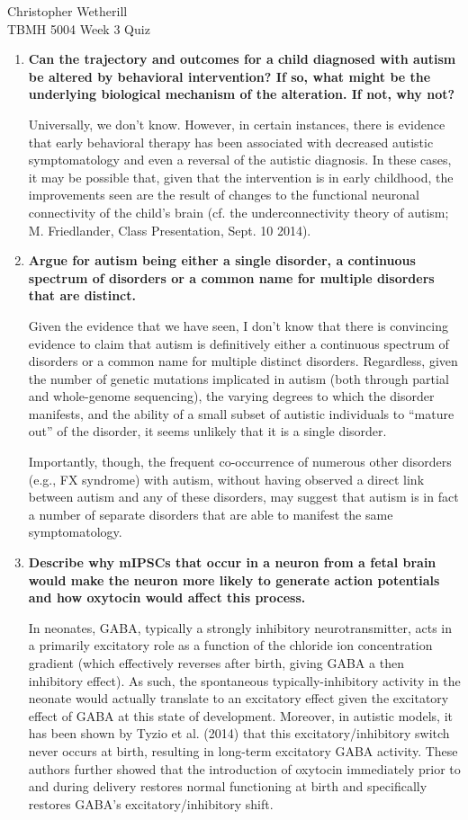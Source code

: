 \documentclass[11pt,final] {article}
\begin{document}
\noindent Christopher Wetherill\\
TBMH 5004 Week 3 Quiz

\begin{enumerate}
	\item {\bfseries Can the trajectory and outcomes for a child diagnosed with autism be altered by behavioral intervention? If so, what might be the underlying biological mechanism of the alteration. If not, why not?}
	
	Universally, we don't know. However, in certain instances, there is evidence that early behavioral therapy has been associated with decreased autistic symptomatology and even a reversal of the autistic diagnosis. In these cases, it may be possible that, given that the intervention is in early childhood, the improvements seen are the result of changes to the functional neuronal connectivity of the child's brain (cf. the underconnectivity theory of autism; M. Friedlander, Class Presentation, Sept. 10 2014).
	
	\item {\bfseries Argue for autism being either a single disorder, a continuous spectrum of disorders or a common name for multiple disorders that are distinct.}
	
	Given the evidence that we have seen, I don't know that there is convincing evidence to claim that autism is definitively either a continuous spectrum of disorders or a common name for multiple distinct disorders. Regardless, given the number of genetic mutations implicated in autism (both through partial and whole-genome sequencing), the varying degrees to which the disorder manifests, and the ability of a small subset of autistic individuals to ``mature out'' of the disorder, it seems unlikely that it is a single disorder.
	
	Importantly, though, the frequent co-occurrence of numerous other disorders (e.g., FX syndrome) with autism, without having observed a direct link between autism and any of these disorders, may suggest that autism is in fact a number of separate disorders that are able to manifest the same symptomatology.
	
	\item {\bfseries Describe why mIPSCs that occur in a neuron from a fetal brain would make the neuron more likely to generate action potentials and how oxytocin would affect this process.}
	
	In neonates, GABA, typically a strongly inhibitory neurotransmitter, acts in a primarily excitatory role as a function of the chloride ion concentration gradient (which effectively reverses after birth, giving GABA a then inhibitory effect). As such, the spontaneous typically-inhibitory activity in the neonate would actually translate to an excitatory effect given the excitatory effect of GABA at this state of development. Moreover, in autistic models, it has been shown by Tyzio et al. (2014) that this excitatory/inhibitory switch never occurs at birth, resulting in long-term excitatory GABA activity. These authors further showed that the introduction of oxytocin immediately prior to and during delivery restores normal functioning at birth and specifically restores GABA's excitatory/inhibitory shift.
	

\end{enumerate}
\end{document}
